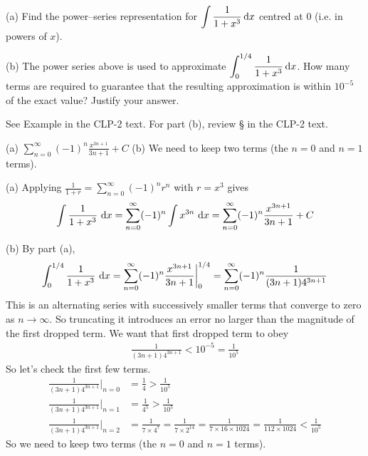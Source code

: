 \begin{Mquestion}[2013A]
 (a)  Find the power--series representation for
$\displaystyle\int\frac{1}{1+x^3}\,\mathrm{d}x$ centred at $0$ (i.e. in powers of
$x$).

\noindent (b) The power series above is used to approximate
$\displaystyle\int_0^{1/4}\frac{1}{1+x^3}\,\mathrm{d}x$. How many terms are
required to guarantee that the resulting approximation is within
$10^{-5}$ of the exact value? Justify your answer.
\end{Mquestion}

\begin{hint}
See Example  in the
CLP-2 text.
For part (b), review  \S {} in the
CLP-2 text.
\end{hint}

\begin{answer}
(a)
$\displaystyle\sum\limits_{n=0}^\infty(-1)^n \frac{x^{3n+1}}{3n+1} +C$
\quad (b)
We need to keep two terms (the $n=0$ and $n=1$ terms).
\end{answer}

\begin{solution} (a)
Applying $\displaystyle\frac{1}{1+r}=\sum\limits_{n=0}^\infty (-1)^nr^n$ with $r=x^3$
gives
\begin{align*}
\int\frac{1}{1+x^3}\ \dee{x} =\sum_{n=0}^\infty(-1)^n \int x^{3n}\ \dee{x}
=\sum_{n=0}^\infty(-1)^n \frac{x^{3n+1}}{3n+1} +C
\end{align*}


\noindent (b) By part (a),
\begin{align*}
\int_0^{1/4}\frac{1}{1+x^3}\ \mathrm{d}x
=\sum_{n=0}^\infty(-1)^n \frac{x^{3n+1}}{3n+1} \bigg|_0^{1/4}
=\sum_{n=0}^\infty(-1)^n \frac{1}{(3n+1)4^{3n+1}}
\end{align*}
This is an alternating series with successively smaller terms that converge
to zero as $n\rightarrow\infty$. So truncating
it introduces an error no larger than the magnitude of the first dropped
term. We want that first dropped term to obey
\begin{align*}
\frac{1}{(3n+1)4^{3n+1}}<10^{-5}=\frac{1}{10^5}
\end{align*}
So let's check the first few terms.
\begin{align*}
\frac{1}{(3n+1)4^{3n+1}}\bigg|_{n=0}&=\frac{1}{4}>\frac{1}{10^5}\\
\frac{1}{(3n+1)4^{3n+1}}\bigg|_{n=1}&=\frac{1}{4^5}>\frac{1}{10^5}\\
\frac{1}{(3n+1)4^{3n+1}}\bigg|_{n=2}&=\frac{1}{7\times 4^7}
                         =\frac{1}{7\times 2^{14}}
                         =\frac{1}{7\times16\times 1024}
                         =\frac{1}{112\times 1024}<\frac{1}{10^5}
\end{align*}
So we need to keep two terms (the $n=0$ and $n=1$ terms).

\end{solution}


